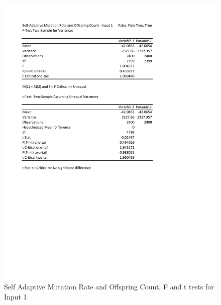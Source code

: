 \documentclass[times]{article}
\begin{document}
	\begin{figure}
		\caption{Self Adaptive Mutation Rate and Offspring Count,  F and t tests for Input 1}
		\label{fig:saMutOffspring1}
		\includegraphics[width=\textwidth]{./t_test/S-A1Bonus2}
	\end{figure}
\end{document}
